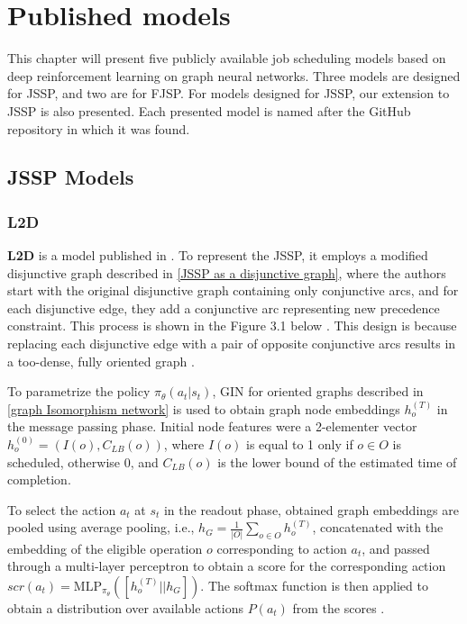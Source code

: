 \chapter{Published models}

This chapter will present five publicly available job scheduling models based on deep reinforcement learning on graph neural networks. Three models are designed for JSSP, and two are for FJSP. For models designed for JSSP, our extension to JSSP is also presented. Each presented model is named after the GitHub repository in which it was found. 

\section{JSSP Models}

\subsection{L2D}
\textbf{L2D} is a model published in \cite{zhang2020learning}. To represent the JSSP, it employs a modified disjunctive graph described in \ref{JSSP as a disjunctive graph}, where the authors start with the original disjunctive graph containing only conjunctive arcs, and for each disjunctive edge, they add a conjunctive arc representing new precedence constraint. This process is shown in the Figure 3.1 below \cite{zhang2020learning}. This design is because replacing each disjunctive edge with a pair of opposite conjunctive arcs results in a too-dense, fully oriented graph \cite{zhang2020learning}.
\par
To parametrize the policy $\pi_\theta(a_t|s_t)$, GIN for oriented graphs described in \ref{graph Isomorphism network} is used to obtain graph node embeddings $h_o^{(T)}$ in the message passing phase. Initial node features were a 2-elementer vector $h_o^{(0)} = (I(o), C_{LB}(o))$, where $I(o)$ is equal to 1 only if $o \in O$ is scheduled, otherwise 0, and $C_{LB}(o)$ is the lower bound of the estimated time of completion. 
\par
To select the action $a_t$ at $s_t$ in the readout phase, obtained graph embeddings are pooled using average pooling, i.e., $h_G = \frac{1}{|O|} \sum_{o \in O} h_o^{(T)}$, concatenated with the embedding of the eligible operation $o$ corresponding to action $a_t$, and passed through a multi-layer perceptron to obtain a score for the corresponding action $scr(a_t) = \text{MLP}_{\pi_\theta}\left ( \left [h_o^{(T)} || h_G \right ] \right )$. The softmax function is then applied to obtain a distribution over available actions $P(a_t)$ from the scores \cite{zhang2020learning}.\\
